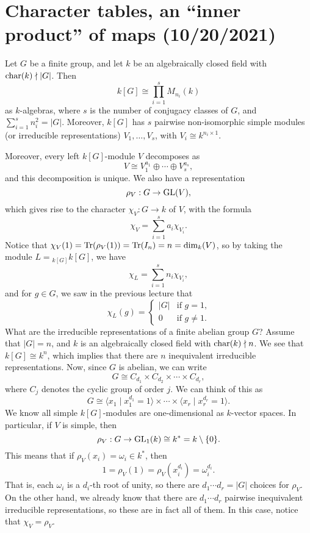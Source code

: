 \section{Character tables, an ``inner product'' of maps (10/20/2021)}
Let $G$ be a finite group, and let $k$ be an algebraically closed field with 
$\operatorname{char}(k) \nmid |G|$. Then 
\[ k[G] \cong \prod_{i=1}^s M_{n_i}(k) \] 
as $k$-algebras, where $s$ is the number of conjugacy classes of $G$, and 
$\sum_{i=1}^s n_i^2 = |G|$. Moreover, $k[G]$ has $s$ pairwise non-isomorphic 
simple modules (or irreducible representations) $V_1, \dots, V_s$, with 
$V_i \cong k^{n_i\times 1}$. 

Moreover, every left $k[G]$-module $V$ decomposes as 
\[ V \cong V_1^{a_1} \oplus \cdots \oplus V_s^{a_s}, \] 
and this decomposition is unique. We also have a representation 
\[ \rho_V : G \to \operatorname{GL}(V), \] 
which gives rise to the character $\chi_V : G \to k$ of $V$, with the formula 
\[ \chi_V = \sum_{i=1}^s a_i \chi_{V_i}. \] 
Notice that $\chi_V(1) = \operatorname{Tr}(\rho_V(1)) = \operatorname{Tr}(I_n) = n = \dim_k(V)$, so 
by taking the module $L = {}_{k[G]} k[G]$, we have 
\[ \chi_L = \sum_{i=1}^s n_i \chi_{V_i}, \] 
and for $g \in G$, we saw in the previous lecture that  
\[ \chi_L(g) = \begin{cases} 
    |G| & \text{if $g = 1$,} \\ 
    0 & \text{if $g \neq 1$.}
\end{cases} \] 
What are the irreducible representations of a finite abelian group $G$? 
Assume that $|G| = n$, and $k$ is an algebraically closed field with $\operatorname{char}(k) 
\nmid n$. We see that $k[G] \cong k^n$, which implies that there are $n$ 
inequivalent irreducible representations. Now, since $G$ is abelian, we can write 
\[ G \cong C_{d_1} \times C_{d_2} \times \cdots \times C_{d_r}, \] 
where $C_j$ denotes the cyclic group of order $j$. We can think of this as 
\[ G \cong \langle x_1 \mid x_1^{d_1} = 1 \rangle \times \cdots \times 
\langle x_r \mid x_r^{d_r} = 1 \rangle. \] 
We know all simple $k[G]$-modules are one-dimensional as $k$-vector spaces. 
In particular, if $V$ is simple, then 
\[ \rho_V : G \to \operatorname{GL}_1(k) \cong k^* = k \setminus \{0\}. \] 
This means that if $\rho_V(x_i) = \omega_i \in k^*$, then 
\[ 1 = \rho_V(1) = \rho_V(x_i^{d_i}) = \omega_i^{d_i}. \] 
That is, each $\omega_i$ is a $d_i$-th root of unity, so there are 
$d_1\cdots d_r = |G|$ choices for $\rho_V$. On the other hand, we already know 
that there are $d_1 \cdots d_r$ pairwise inequivalent irreducible representations,
so these are in fact all of them. In this case, notice that $\chi_V = \rho_V$. 

